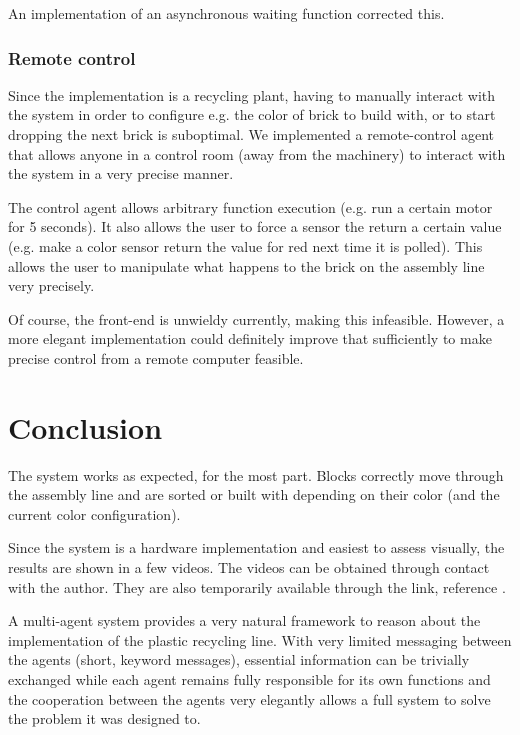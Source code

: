 \documentclass[conference]{IEEEtran}
\begin{document}
An implementation of an asynchronous waiting function corrected this. 

\subsubsection{Remote control}

Since the implementation is a recycling plant, having to manually interact with the system in order to configure e.g. the color of brick to build with, or to start dropping the next brick is suboptimal. We implemented a remote-control agent that allows anyone in a control room (away from the machinery) to interact with the system in a very precise manner. 

The control agent allows arbitrary function execution (e.g. run a certain motor for 5 seconds). It also allows the user to force a sensor the return a certain value (e.g. make a color sensor return the value for red next time it is polled). This allows the user to manipulate what happens to the brick on the assembly line very precisely. 

Of course, the front-end is unwieldy currently, making this infeasible. However, a more elegant implementation could definitely improve that sufficiently to make precise control from a remote computer feasible. 

\section{Conclusion}

The system works as expected, for the most part. Blocks correctly move through the assembly line and are sorted or built with depending on their color (and the current color configuration). 

Since the system is a hardware implementation and easiest to assess visually, the results are shown in a few videos. The videos can be obtained through contact with the author. They are also temporarily available through the link, reference \cite{resultslink}. 

A multi-agent system provides a very natural framework to reason about the implementation of the plastic recycling line. With very limited messaging between the agents (short, keyword messages), essential information can be trivially exchanged while each agent remains fully responsible for its own functions and the cooperation between the agents very elegantly allows a full system to solve the problem it was designed to.
\end{document}
